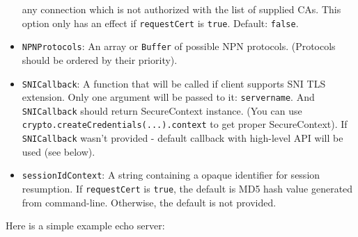 \begin{itemize}
  any connection which is not authorized with the list of supplied CAs.
  This option only has an effect if \texttt{requestCert} is
  \texttt{true}. Default: \texttt{false}.
\item
  \texttt{NPNProtocols}: An array or \texttt{Buffer} of possible NPN
  protocols. (Protocols should be ordered by their priority).
\item
  \texttt{SNICallback}: A function that will be called if client
  supports SNI TLS extension. Only one argument will be passed to it:
  \texttt{servername}. And \texttt{SNICallback} should return
  SecureContext instance. (You can use
  \texttt{crypto.createCredentials(...).context} to get proper
  SecureContext). If \texttt{SNICallback} wasn't provided - default
  callback with high-level API will be used (see below).
\item
  \texttt{sessionIdContext}: A string containing a opaque identifier for
  session resumption. If \texttt{requestCert} is \texttt{true}, the
  default is MD5 hash value generated from command-line. Otherwise, the
  default is not provided.
\end{itemize}

Here is a simple example echo server:

